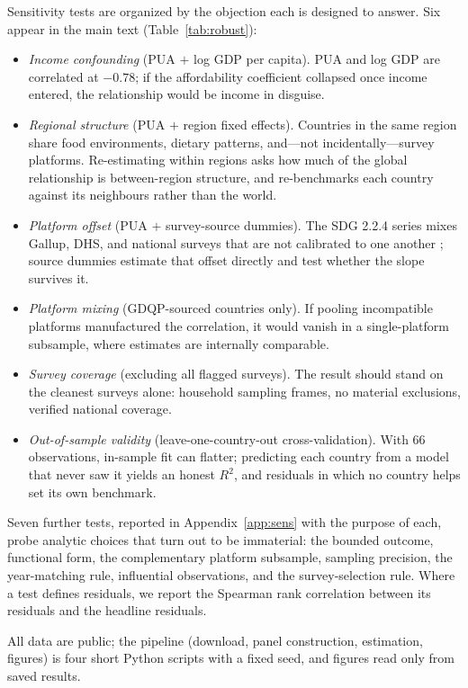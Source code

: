 \documentclass[11pt]{article}
\begin{document}
Sensitivity tests are organized by the objection each is designed to answer. Six appear in the main text (Table~\ref{tab:robust}):
\begin{itemize}
\item \emph{Income confounding} (PUA $+$ log GDP per capita). PUA and log GDP are correlated at $-0.78$; if the affordability coefficient collapsed once income entered, the relationship would be income in disguise.
\item \emph{Regional structure} (PUA $+$ region fixed effects). Countries in the same region share food environments, dietary patterns, and---not incidentally---survey platforms. Re-estimating within regions asks how much of the global relationship is between-region structure, and re-benchmarks each country against its neighbours rather than the world.
\item \emph{Platform offset} (PUA $+$ survey-source dummies). The SDG 2.2.4 series mixes Gallup, DHS, and national surveys that are not calibrated to one another \citep{hanleycook2025}; source dummies estimate that offset directly and test whether the slope survives it.
\item \emph{Platform mixing} (GDQP-sourced countries only). If pooling incompatible platforms manufactured the correlation, it would vanish in a single-platform subsample, where estimates are internally comparable.
\item \emph{Survey coverage} (excluding all flagged surveys). The result should stand on the cleanest surveys alone: household sampling frames, no material exclusions, verified national coverage.
\item \emph{Out-of-sample validity} (leave-one-country-out cross-validation). With 66 observations, in-sample fit can flatter; predicting each country from a model that never saw it yields an honest $R^2$, and residuals in which no country helps set its own benchmark.
\end{itemize}
Seven further tests, reported in Appendix~\ref{app:sens} with the purpose of each, probe analytic choices that turn out to be immaterial: the bounded outcome, functional form, the complementary platform subsample, sampling precision, the year-matching rule, influential observations, and the survey-selection rule. Where a test defines residuals, we report the Spearman rank correlation between its residuals and the headline residuals.

All data are public; the pipeline (download, panel construction, estimation, figures) is four short Python scripts with a fixed seed, and figures read only from saved results.
\end{document}
